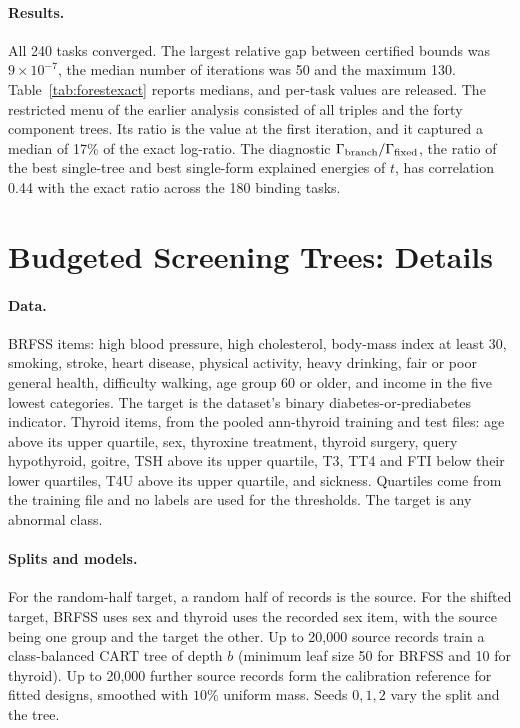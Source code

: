 \paragraph{Results.}
All 240 tasks converged. The largest relative gap between certified bounds was $9\times10^{-7}$, the median number of iterations was 50 and the maximum 130. Table~\ref{tab:forestexact} reports medians, and per-task values are released. The restricted menu of the earlier analysis consisted of all triples and the forty component trees. Its ratio is the value at the first iteration, and it captured a median of 17\% of the exact log-ratio. The diagnostic $\Gamma_{\rm branch}/\Gamma_{\rm fixed}$, the ratio of the best single-tree and best single-form explained energies of $t$, has correlation 0.44 with the exact ratio across the 180 binding tasks.

\section{Budgeted Screening Trees: Details}\label{app:screening}
\paragraph{Data.}
BRFSS items: high blood pressure, high cholesterol, body-mass index at least 30, smoking, stroke, heart disease, physical activity, heavy drinking, fair or poor general health, difficulty walking, age group 60 or older, and income in the five lowest categories. The target is the dataset's binary diabetes-or-prediabetes indicator. Thyroid items, from the pooled ann-thyroid training and test files: age above its upper quartile, sex, thyroxine treatment, thyroid surgery, query hypothyroid, goitre, TSH above its upper quartile, T3, TT4 and FTI below their lower quartiles, T4U above its upper quartile, and sickness. Quartiles come from the training file and no labels are used for the thresholds. The target is any abnormal class.

\paragraph{Splits and models.}
For the random-half target, a random half of records is the source. For the shifted target, BRFSS uses sex and thyroid uses the recorded sex item, with the source being one group and the target the other. Up to 20,000 source records train a class-balanced CART tree of depth $b$ (minimum leaf size 50 for BRFSS and 10 for thyroid). Up to 20,000 further source records form the calibration reference for fitted designs, smoothed with $10\%$ uniform mass. Seeds $0,1,2$ vary the split and the tree.

